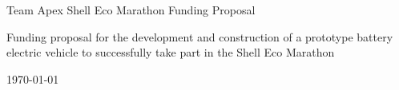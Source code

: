 \documentclass[a4paper, 12pt]{article}
\begin{document}
	\hypersetup{pageanchor=false}
	\begin{titlepage}
		{\LARGE \centerline{Team Apex Shell Eco Marathon Funding Proposal}\par}
		\vspace*{\fill}
		{\large\centering Funding proposal for the development and construction of a prototype battery electric vehicle to successfully take part in the Shell Eco Marathon\par}
		\vspace*{\fill}
		{\centerline{\today}}
	\end{titlepage}
\end{document}
